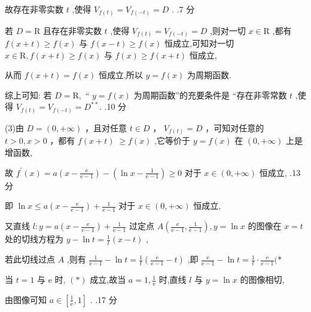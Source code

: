 \documentclass[10pt]{article}
\begin{document}
故存在非零实数 \(t\) ,使得 \({V}_{f\left( t\right) } = {V}_{f\left( {-t}\right) } = D\) . .7 分

若 \(D = \mathrm{R}\) 且存在非零实数 \(t\) ,使得 \({V}_{f\left( t\right) } = {V}_{f\left( {-t}\right) } = D\) ,则对一切 \(x \in  \mathrm{R}\) ,都有 \(f\left( {x + t}\right)  \geq  f\left( x\right)\) 与 \(f\left( {x - t}\right)  \geq  f\left( x\right)\) 恒成立,可知对一切 \(x \in  \mathrm{R},f\left( {x + t}\right)  \geq  f\left( x\right)\) 与 \(f\left( x\right)  \geq  f\left( {x + t}\right)\) 恒成立,

从而 \(f\left( {x + t}\right)  = f\left( x\right)\) 恒成立,所以 \(y = f\left( x\right)\) 为周期函数.

综上可知: 若 \(D = \mathrm{R},\) “ \(y = f\left( x\right)\) 为周期函数”的充要条件是 “存在非零常数 \(t\) ,使得 \({V}_{f\left( t\right) } = {V}_{f\left( {-t}\right) } = {D}^{* * }.\) .10 分

(3)由 \(D = \left( {0, + \infty }\right)\) ，且对任意 \(t \in  D\) ， \({V}_{f\left( t\right) } = D\) ，可知对任意的 \(t > 0,x > 0\) ，都有 \(f\left( {x + t}\right) \; \geq  f\left( x\right)\) ,它等价于 \(y = f\left( x\right)\) 在 \(\left( {0, + \infty }\right)\) 上是增函数,

故 \({f}^{\prime }\left( x\right)  = a\left( {x - \frac{\mathrm{e}}{\mathrm{e} - 1}}\right)  - \left( {\ln x - \frac{1}{\mathrm{e} - 1}}\right)  \geq  0\) 对于 \(x \in  \left( {0, + \infty }\right)\) 恒成立, .13 分

即 \(\ln x \leq  a\left( {x - \frac{\mathrm{e}}{\mathrm{e} - 1}}\right)  + \frac{1}{\mathrm{e} - 1}\) 对于 \(x \in  \left( {0, + \infty }\right)\) 恒成立,

又直线 \(l : y = a\left( {x - \frac{\mathrm{e}}{\mathrm{e} - 1}}\right)  + \frac{1}{\mathrm{e} - 1}\) 过定点 \(A\left( {\frac{\mathrm{e}}{\mathrm{e} - 1},\frac{1}{\mathrm{e} - 1}}\right) ,y = \ln x\) 的图像在 \(x = t\) 处的切线方程为 \(y - \ln t = \frac{1}{t}\left( {x - t}\right)\) ,

若此切线过点 \(A\) ,则有 \(\frac{1}{\mathrm{e} - 1} - \ln t = \frac{1}{t}\left( {\frac{\mathrm{e}}{\mathrm{e} - 1} - t}\right)\) ,即 \(\frac{\mathrm{e}}{\mathrm{e} - 1} - \ln t = \frac{1}{t} \cdot  \frac{\mathrm{e}}{\mathrm{e} - 1}( *\)

当 \(t = 1\) 与 \(\mathrm{e}\) 时, \(\left( *\right)\) 成立,故当 \(a = 1,\frac{1}{\mathrm{e}}\) 时,直线 \(l\) 与 \(y = \ln x\) 的图像相切,

由图像可知 \(a \in  \left\lbrack  {\frac{1}{\mathrm{e}},1}\right\rbrack\) . .17 分
\end{document}
